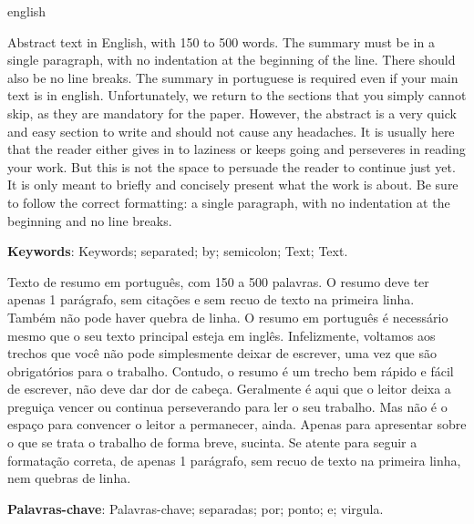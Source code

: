 
\begin{resumo}[Abstract]
\begin{otherlanguage*}{english}

\noindent Abstract text in English, with 150 to 500 words. The summary must be in a single paragraph, with no indentation at the beginning of the line. There should also be no line breaks. The summary in portuguese is required even if your main text is in english. Unfortunately, we return to the sections that you simply cannot skip, as they are mandatory for the paper. However, the abstract is a very quick and easy section to write and should not cause any headaches. It is usually here that the reader either gives in to laziness or keeps going and perseveres in reading your work. But this is not the space to persuade the reader to continue just yet. It is only meant to briefly and concisely present what the work is about. Be sure to follow the correct formatting: a single paragraph, with no indentation at the beginning and no line breaks.

   \vspace{\onelineskip}

   \noindent
      \textbf{Keywords}: Keywords; separated; by; semicolon; Text; Text.

  \end{otherlanguage*}
 \end{resumo}


\begin{resumo}[Resumo]
\noindent Texto de resumo em português, com 150 a 500 palavras. O resumo deve ter apenas 1 parágrafo, sem citações e sem recuo de texto na primeira linha. Também não pode haver quebra de linha. O resumo em português é necessário mesmo que o seu texto principal esteja em inglês. Infelizmente, voltamos aos trechos que você não pode simplesmente deixar de escrever, uma vez que são obrigatórios para o trabalho. Contudo, o resumo é um trecho bem rápido e fácil de escrever, não deve dar dor de cabeça. Geralmente é aqui que o leitor deixa a preguiça vencer ou continua perseverando para ler o seu trabalho. Mas não é o espaço para convencer o leitor a permanecer, ainda. Apenas para apresentar sobre o que se trata o trabalho de forma breve, sucinta. Se atente para seguir a formatação correta, de apenas 1 parágrafo, sem recuo de texto na primeira linha, nem quebras de linha.

 \vspace{\onelineskip}

 \noindent
 \textbf{Palavras-chave}: Palavras-chave; separadas; por; ponto; e; virgula.
\end{resumo}
